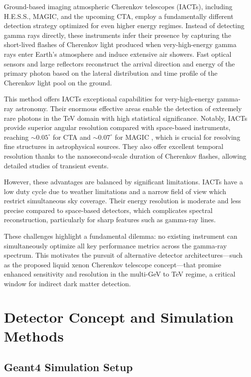 \documentclass{aastex701}
\begin{document}
Ground-based imaging atmospheric Cherenkov telescopes (IACTs), including H.E.S.S., MAGIC, and the upcoming CTA, employ a fundamentally different detection strategy optimized for even higher energy regimes. Instead of detecting gamma rays directly, these instruments infer their presence by capturing the short-lived flashes of Cherenkov light produced when very-high-energy gamma rays enter Earth’s atmosphere and induce extensive air showers. Fast optical sensors and large reflectors reconstruct the arrival direction and energy of the primary photon based on the lateral distribution and time profile of the Cherenkov light pool on the ground.

This method offers IACTs exceptional capabilities for very-high-energy gamma-ray astronomy. Their enormous effective areas enable the detection of extremely rare photons in the TeV domain with high statistical significance. Notably, IACTs provide superior angular resolution compared with space-based instruments, reaching $\sim0.05^\circ$ for CTA \cite{CTAO_performance_2025}and $\sim0.07^\circ$ for MAGIC \cite{Aleksic2016_MAGICupgrade2}, which is crucial for resolving fine structures in astrophysical sources. They also offer excellent temporal resolution thanks to the nanosecond-scale duration of Cherenkov flashes, allowing detailed studies of transient events.

However, these advantages are balanced by significant limitations. IACTs have a low duty cycle due to weather limitations and a narrow field of view which restrict simultaneous sky coverage. Their energy resolution is moderate and less precise compared to space-based detectors, which complicates spectral reconstruction, particularly for sharp features such as gamma-ray lines.

These challenges highlight a fundamental dilemma: no existing instrument can simultaneously optimize all key performance metrics across the gamma-ray spectrum. This motivates the pursuit of alternative detector architectures—such as the proposed liquid xenon Cherenkov telescope concept—that promise enhanced sensitivity and resolution in the multi-GeV to TeV regime, a critical window for indirect dark matter detection.

\section{Detector Concept and Simulation Methods}

\subsection{Geant4 Simulation Setup}
\end{document}
